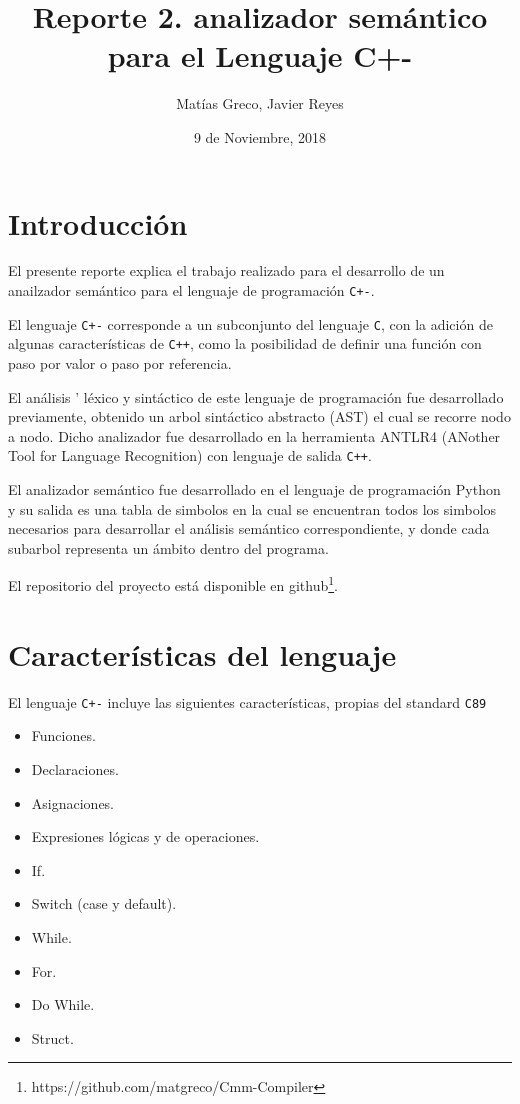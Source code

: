 \documentclass[12pt]{article}
\newcommand{\Cp}{\texttt{C+-}}
\newcommand{\C}{\texttt{C}}
\newcommand{\Cpp}{\texttt{C++}}
\begin{document}

\title{Reporte 2. analizador semántico para el Lenguaje C+-}
\author{Mat\'ias Greco, Javier Reyes}
\date{9 de Noviembre, 2018}
\maketitle

\section*{Introducci\'on}
El presente reporte explica el trabajo realizado para el desarrollo de un anailzador sem\'antico para el lenguaje de programaci\'on \Cp.

El lenguaje \texttt{C+-} corresponde a un subconjunto del lenguaje \C, con la adici\'on de algunas caracter\'isticas de \Cpp, como la posibilidad de definir una funci\'on con paso por valor o paso por referencia.

El an\'alisis  ' l\'exico y sint\'actico de este lenguaje de programación fue desarrollado previamente, obtenido un arbol sintáctico abstracto (AST) el cual se recorre nodo a nodo. Dicho analizador fue desarrollado en la herramienta ANTLR4 (ANother Tool for Language Recognition) con lenguaje de salida \Cpp. 

El analizador sem\'antico fue desarrollado en el lenguaje de programación Python y su salida es una tabla de simbolos en la cual se encuentran todos los simbolos necesarios para desarrollar el an\'alisis sem\'antico correspondiente, y donde cada subarbol representa un \'ambito dentro del programa.

El repositorio del proyecto está disponible en github\footnote{https://github.com/matgreco/Cmm-Compiler}.


\section*{Caracter\'isticas del lenguaje}

El lenguaje \texttt{C+-} incluye las siguientes caracter\'isticas, propias del standard \texttt{C89}
\begin{itemize}
    \item Funciones.
    \item Declaraciones.
    \item Asignaciones.
    \item Expresiones l\'ogicas y de operaciones.
    \item If.
    \item Switch (case y default).
    \item While.
    \item For.
    \item Do While.
    \item Struct.
\end{itemize}
\end{document}
